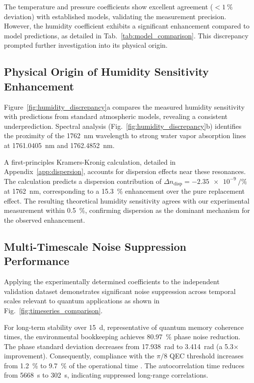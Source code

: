 \documentclass[aps,pra,reprint,groupedaddress,twocolumn,superscriptaddress]{revtex4-2}
\begin{document}
The temperature and pressure coefficients show excellent agreement ($<\SI{1}{\percent}$ deviation) with established models, validating the measurement precision. However, the humidity coefficient exhibits a significant enhancement compared to model predictions, as detailed in Tab.~\ref{tab:model_comparison}. This discrepancy prompted further investigation into its physical origin.

\subsection{Physical Origin of Humidity Sensitivity Enhancement}
\label{sec:humidity_origin}

Figure~\ref{fig:humidity_discrepancy}a compares the measured humidity sensitivity with predictions from standard atmospheric models, revealing a consistent underprediction. Spectral analysis (Fig.~\ref{fig:humidity_discrepancy}b) identifies the proximity of the \SI{1762}{\nano\meter} wavelength to strong water vapor absorption lines at \SI{1761.0405}{\nano\meter} and \SI{1762.4852}{\nano\meter}.

A first-principles Kramers-Kronig calculation, detailed in Appendix~\ref{app:dispersion}, accounts for dispersion effects near these resonances. The calculation predicts a dispersion contribution of $\Delta n_{\text{disp}} = \SI{-2.35e-9}{\per\percent}$ at \SI{1762}{\nano\meter}, corresponding to a \SI{15.3}{\percent} enhancement over the pure replacement effect. The resulting theoretical humidity sensitivity agrees with our experimental measurement within \SI{0.5}{\percent}, confirming dispersion as the dominant mechanism for the observed enhancement.

\subsection{Multi-Timescale Noise Suppression Performance}
\label{sec:subtraction}

Applying the experimentally determined coefficients to the independent validation dataset demonstrates significant noise suppression across temporal scales relevant to quantum applications as shown in Fig.~\ref{fig:timeseries_comparison}.

For long-term stability over \SI{15}{\day}, representative of quantum memory coherence times, the environmental bookkeeping achieves \SI{80.97}{\percent} phase noise reduction. The phase standard deviation decreases from \SI{17.938}{\radian} to \SI{3.414}{\radian} (a 5.3$\times$ improvement). Consequently, compliance with the $\pi/8$ QEC threshold increases from \SI{1.2}{\percent} to \SI{9.7}{\percent} of the operational time \cite{preskill1998reliable,fowler2012surface, terhal2015quantum}. The autocorrelation time reduces from \SI{5668}{\second} to \SI{302}{\second}, indicating suppressed long-range correlations.
\end{document}
